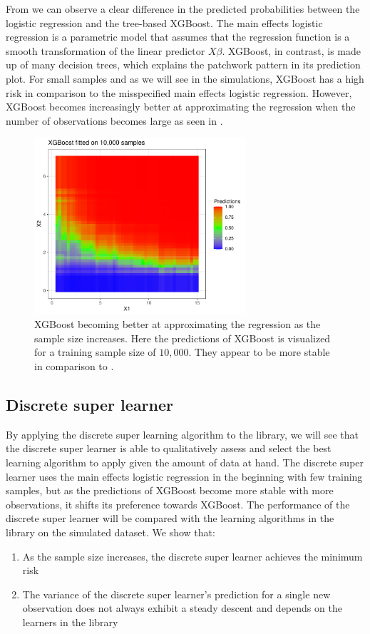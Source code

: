 \documentclass[./main.tex]{subfiles}
\begin{document}
From  we can observe a clear difference in the predicted probabilities between the logistic regression and the tree-based XGBoost. The main effects logistic regression is a parametric model that assumes that the regression function is a smooth transformation of the linear predictor $ X\beta $. XGBoost, in contrast, is made up of many decision trees, which explains the patchwork pattern in its prediction plot. For small samples and as we will see in the simulations, XGBoost has a high risk in comparison to the misspecified main effects logistic regression. However, XGBoost becomes increasingly better at approximating the regression when the number of observations becomes large as seen in . 
\begin{figure}[H]
    \centering
    \includegraphics[width=0.7\textwidth]{figures/xgboost10k.pdf}
    \caption{XGBoost becoming better at approximating the regression as the sample size increases. Here the predictions of XGBoost is visualized for a training sample size of $ 10,000 $. They appear to be more stable in comparison to .}
    \label{fig:xgboost10k}
\end{figure}
\subsection{Discrete super learner} \label{sim_dsl}
By applying the discrete super learning algorithm to the library, we will see that the discrete super learner is able to qualitatively assess and select the best learning algorithm to apply given the amount of data at hand. The discrete super learner uses the main effects logistic regression in the beginning with few training samples, but as the predictions of XGBoost become more stable with more observations, it shifts its preference towards XGBoost. The performance of the discrete super learner will be compared with the learning algorithms in the library on the simulated dataset. We show that:
\begin{enumerate}
    \item As the sample size increases, the discrete super learner achieves the minimum risk 
    \item The variance of the discrete super learner's prediction for a single new observation does not always exhibit a steady descent and depends on the learners in the library
\end{enumerate}
\end{document}
